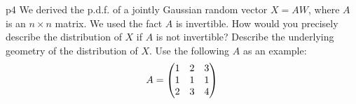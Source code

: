 \documentclass[a4paper, 11pt]{article}
\begin{document}

\begin{problem}{%
    }{p4%
    }
    We derived the p.d.f. of a jointly Gaussian random vector $X=AW$, where $A$ is an $n\times n$ matrix. We used the fact $A$ is invertible. How would you precisely describe the distribution of $X$ if $A$ is not invertible? Describe the underlying geometry of the distribution of $X$. Use the following $A$ as an example: $$A=\left(\begin{matrix}1 & 2 &3\\ 1 & 1&1\\ 2&3&4\end{matrix}\right)$$
\end{problem}
\solve{
}
\end{document}
